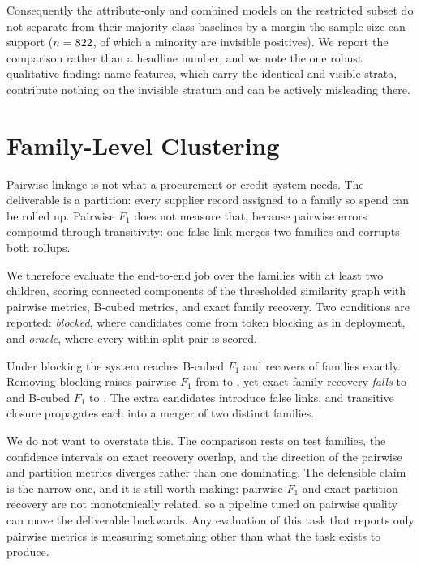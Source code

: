 Consequently the attribute-only and combined models on the restricted subset do not
separate from their majority-class baselines by a margin the sample size can support
($n=822$, of which a minority are invisible positives). We report the
comparison rather than a headline number, and we note the one robust qualitative finding:
name features, which carry the identical and visible strata, contribute nothing on the
invisible stratum and can be actively misleading there.

\section{Family-Level Clustering}
\label{sec:clustering}

Pairwise linkage is not what a procurement or credit system needs. The deliverable is a
partition: every supplier record assigned to a family so spend can be rolled up. Pairwise
$F_1$ does not measure that, because pairwise errors compound through transitivity: one
false link merges two families and corrupts both rollups.

We therefore evaluate the end-to-end job over the \ClusFamilies families with at least two
children, scoring connected components of the thresholded similarity graph with pairwise
metrics, B-cubed metrics, and exact family recovery. Two conditions are reported:
\emph{blocked}, where candidates come from token blocking as in deployment, and
\emph{oracle}, where every within-split pair is scored.



Under blocking the system reaches \ClusBlockedBcubed B-cubed $F_1$ and recovers
\ClusBlockedExact of families exactly. Removing blocking raises pairwise $F_1$ from
\ClusBlockedPairF to \ClusOraclePairF, yet exact family recovery \emph{falls} to
\ClusOracleExact and B-cubed $F_1$ to \ClusOracleBcubed. The extra candidates introduce
false links, and transitive closure propagates each into a merger of two distinct
families.

We do not want to overstate this. The comparison rests on \ClusTestFamilies test
families, the confidence intervals on exact recovery overlap, and the direction of the
pairwise and partition metrics diverges rather than one dominating. The defensible claim
is the narrow one, and it is still worth making: pairwise $F_1$ and exact partition
recovery are not monotonically related, so a pipeline tuned on pairwise quality can move
the deliverable backwards. Any evaluation of this task that reports only pairwise
metrics is measuring something other than what the task exists to produce.


